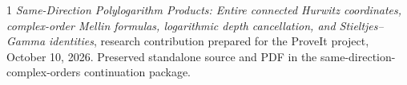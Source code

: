 \documentclass[11pt]{article}
\begin{document}

\begin{thebibliography}{1}
 \emph{Same-Direction Polylogarithm Products: Entire connected
Hurwitz coordinates, complex-order Mellin formulas, logarithmic depth
cancellation, and Stieltjes--Gamma identities}, research contribution
prepared for the ProveIt project, October 10, 2026. Preserved standalone
source and PDF in the same-direction-complex-orders continuation package.
\end{thebibliography}
\end{document}
